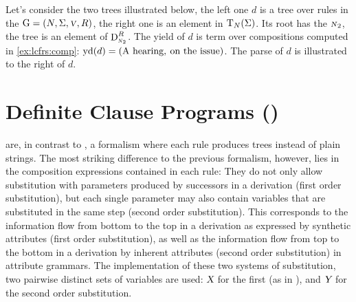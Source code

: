 \documentclass[../document.tex]{subfiles}
\begin{document}
    \begin{example}\label{ex:lcfrs:deriv}
        Let's consider the two trees illustrated below, the left one \(d\) is a tree over rules in the  \(\mathrm{G} = (N, \Sigma, \textsc{\textsl{v}}, R)\), the right one is an element in \(\operatorname{T}_N(\Sigma)\).
        Its root has the  \(\textsc{\textsl{n}}_2\), the tree is an element of \(\operatorname{D}^R_{\textsc{\textsl{n}}_2}\).
        The yield of \(d\) is term over compositions computed in \cref{ex:lcfrs:comp}: \(\operatorname{yd}(d) = (\text{A hearing}, \: \text{on the issue})\).
        The parse of \(d\) is illustrated to the right of \(d\).

        \null\hfill
        \hfill
        \hfill\null
    \end{example}


    \section{Definite Clause Programs ()}
     are, in contrast to , a formalism where each rule produces trees instead of plain strings.
    The most striking difference to the previous formalism, however, lies in the composition expressions contained in each rule:
        They do not only allow substitution with parameters produced by successors in a derivation (first order substitution), but each single parameter may also contain variables that are substituted in the same step (second order substitution).
    This corresponds to the information flow from bottom to the top in a derivation as expressed by synthetic attributes (first order substitution), as well as the information flow from top to the bottom in a derivation by inherent attributes (second order substitution) in attribute grammars.
    The implementation of these two systems of substitution, two pairwise distinct sets of variables are used: \(\textsl{X}\) for the first (as in ), and \(\textsl{Y}\) for the second order substitution.
\end{document}
